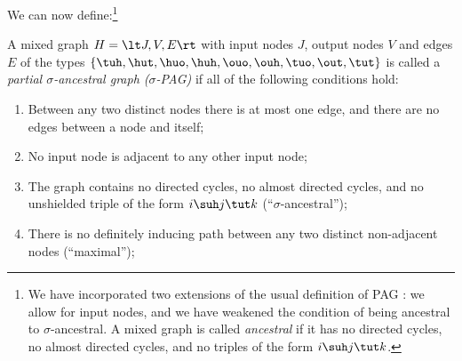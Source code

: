We can now define:\footnote{We have incorporated two extensions of the usual definition of PAG \cite{Zhang2006}: we allow for input 
nodes, and we have weakened the condition of being ancestral to $\sigma$-ancestral. A mixed graph is called \emph{ancestral} if it
has no directed cycles, no almost directed cycles, and no triples of the form $i \suh j \tut k$.}
\begin{Def}\label{def:sigmapag}
  A mixed graph $H = \lt J,V,E\rt$ with input nodes $J$, output nodes $V$ and edges $E$ of the types $\{\tuh,\hut,\huo,\huh,\ouo,\ouh,\tuo,\out,\tut\}$ is called a \emph{partial $\sigma$-ancestral graph ($\sigma$-PAG)} if all of the following conditions hold:
  \begin{enumerate}
    \item Between any two distinct nodes there is at most one edge, and there are no edges between a node and itself;
    \item No input node is adjacent to any other input node;
    \item The graph contains no directed cycles, no almost directed cycles, and no unshielded triple of the form $i \suh j \tut k$ (``$\sigma$-ancestral'');
    \item There is no definitely inducing path between any two distinct non-adjacent nodes (``maximal'');
  \end{enumerate}
\end{Def}

